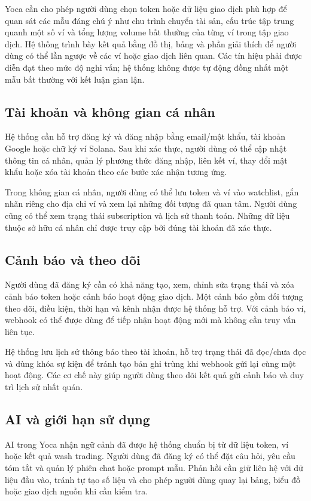 Yoca cần cho phép người dùng chọn token hoặc dữ liệu giao dịch phù hợp để quan sát các mẫu đáng chú ý như chu trình chuyển tài sản, cấu trúc tập trung quanh một số ví và tổng lượng volume bất thường của từng ví trong tập giao dịch. Hệ thống trình bày kết quả bằng đồ thị, bảng và phần giải thích để người dùng có thể lần ngược về các ví hoặc giao dịch liên quan. Các tín hiệu phải được diễn đạt theo mức độ nghi vấn; hệ thống không được tự động đồng nhất một mẫu bất thường với kết luận gian lận.

\subsection{Tài khoản và không gian cá nhân}

Hệ thống cần hỗ trợ đăng ký và đăng nhập bằng email/mật khẩu, tài khoản Google hoặc chữ ký ví Solana. Sau khi xác thực, người dùng có thể cập nhật thông tin cá nhân, quản lý phương thức đăng nhập, liên kết ví, thay đổi mật khẩu hoặc xóa tài khoản theo các bước xác nhận tương ứng.

Trong không gian cá nhân, người dùng có thể lưu token và ví vào watchlist, gắn nhãn riêng cho địa chỉ ví và xem lại những đối tượng đã quan tâm. Người dùng cũng có thể xem trạng thái subscription và lịch sử thanh toán. Những dữ liệu thuộc sở hữu cá nhân chỉ được truy cập bởi đúng tài khoản đã xác thực.

\subsection{Cảnh báo và theo dõi}

Người dùng đã đăng ký cần có khả năng tạo, xem, chỉnh sửa trạng thái và xóa cảnh báo token hoặc cảnh báo hoạt động giao dịch. Một cảnh báo gồm đối tượng theo dõi, điều kiện, thời hạn và kênh nhận được hệ thống hỗ trợ. Với cảnh báo ví, webhook có thể được dùng để tiếp nhận hoạt động mới mà không cần truy vấn liên tục.

Hệ thống lưu lịch sử thông báo theo tài khoản, hỗ trợ trạng thái đã đọc/chưa đọc và dùng khóa sự kiện để tránh tạo bản ghi trùng khi webhook gửi lại cùng một hoạt động. Các cơ chế này giúp người dùng theo dõi kết quả gửi cảnh báo và duy trì lịch sử nhất quán.

\subsection{AI và giới hạn sử dụng}

AI trong Yoca nhận ngữ cảnh đã được hệ thống chuẩn bị từ dữ liệu token, ví hoặc kết quả wash trading. Người dùng đã đăng ký có thể đặt câu hỏi, yêu cầu tóm tắt và quản lý phiên chat hoặc prompt mẫu. Phản hồi cần giữ liên hệ với dữ liệu đầu vào, tránh tự tạo số liệu và cho phép người dùng quay lại bảng, biểu đồ hoặc giao dịch nguồn khi cần kiểm tra.

